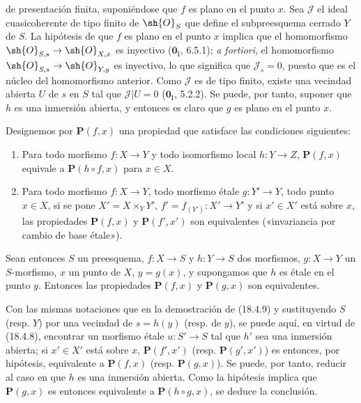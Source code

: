 
de presentación finita, suponiéndose que $f$ es plano en el punto $x$. Sea $\mathscr J$ el ideal cuasicoherente de tipo finito de $\sh{O}_S$ que define el subpreesquema cerrado $Y$ de $S$. La hipótesis de que $f$ es plano en el punto $x$ implica que el homomorfismo $\sh{O}_{S,s}\to\sh{O}_{X,x}$ es inyectivo ($\mathbf{0}_{\mathrm I}$, 6.5.1); \emph{a fortiori}, el homomorfismo $\sh{O}_{S,s}\to\sh{O}_{Y,y}$ es inyectivo, lo que significa que $\mathscr J_s=0$, puesto que es el núcleo del homomorfismo anterior. Como $\mathscr J$ es de tipo finito, existe una vecindad abierta $U$ de $s$ en $S$ tal que $\mathscr J|U=0$ ($\mathbf{0}_{\mathrm I}$, 5.2.2). Se puede, por tanto, suponer que $h$ es una inmersión abierta, y entonces es claro que $g$ es plano en el punto $x$.

\begin{proposition}[18.4.10]
\label{IV.18.4.10}
Designemos por $\boldsymbol{P}(f,x)$ una propiedad que satisface las condiciones siguientes:
\begin{enumerate}
  \item[$1^\circ$] Para todo morfismo $f:X\to Y$ y todo isomorfismo local $h:Y\to Z$, $\boldsymbol{P}(f,x)$ equivale a $\boldsymbol{P}(h\circ f,x)$ para $x\in X$.
  \item[$2^\circ$] Para todo morfismo $f:X\to Y$, todo morfismo étale $g:Y'\to Y$, todo punto $x\in X$, si se pone $X'=X\times_Y Y'$, $f'=f_{(Y')}:X'\to Y'$ y si $x'\in X'$ está sobre $x$, las propiedades $\boldsymbol{P}(f,x)$ y $\boldsymbol{P}(f',x')$ son equivalentes \textup{(«invariancia por cambio de base étale»)}.
\end{enumerate}
Sean entonces $S$ un preesquema, $f:X\to S$ y $h:Y\to S$ dos morfismos, $g:X\to Y$ un $S$-morfismo, $x$ un punto de $X$, $y=g(x)$, y supongamos que $h$ es étale en el punto $y$. Entonces las propiedades $\boldsymbol{P}(f,x)$ y $\boldsymbol{P}(g,x)$ son equivalentes.
\end{proposition}

Con las mismas notaciones que en la demostración de (18.4.9) y sustituyendo $S$ (resp. $Y$) por una vecindad de $s=h(y)$ (resp. de $y$), se puede aquí, en virtud de (18.4.8), encontrar un morfismo étale $u:S'\to S$ tal que $h'$ sea una inmersión abierta; si $x'\in X'$ está sobre $x$, $\boldsymbol{P}(f',x')$ (resp. $\boldsymbol{P}(g',x')$) es entonces, por hipótesis, equivalente a $\boldsymbol{P}(f,x)$ (resp. $\boldsymbol{P}(g,x)$). Se puede, por tanto, reducir al caso en que $h$ es una inmersión abierta. Como la hipótesis implica que $\boldsymbol{P}(g,x)$ es entonces equivalente a $\boldsymbol{P}(h\circ g,x)$, se deduce la conclusión.

